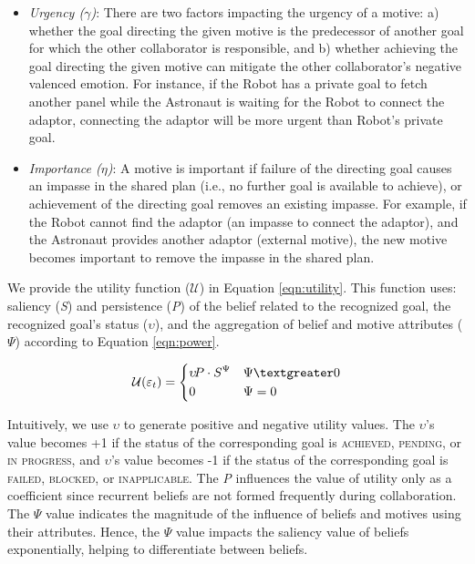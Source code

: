 \documentclass[12pt]{report}
\begin{document}
\begin{itemize}
  \setlength\itemsep{1mm}
  \item \textit{Urgency ($\gamma$)}: There are two factors impacting the urgency
  of a motive: a) whether the goal directing the given motive is the predecessor of
  another goal for which the other collaborator is responsible, and b) whether
  achieving the goal directing the given motive can mitigate the other
  collaborator's negative valenced emotion. For instance, if the Robot has a
  private goal to fetch another panel while the Astronaut is waiting for the
  Robot to connect the adaptor, connecting the adaptor will be more urgent than
  Robot's private goal.
  \item \textit{Importance ($\eta$)}: A motive is important if failure of the
  directing goal causes an impasse in the shared plan (i.e., no further goal is
  available to achieve), or achievement of the directing goal removes an
  existing impasse. For example, if the Robot cannot find the adaptor (an
  impasse to connect the adaptor), and the Astronaut provides another adaptor
  (external motive), the new motive becomes important to remove the impasse in
  the shared plan.
\end{itemize}

We provide the utility function ($\mathcal{U}$) in Equation \ref{eqn:utility}.
This function uses: saliency (\textit{S}) and persistence (\textit{P}) of the
belief related to the recognized goal, the recognized goal's status
($\upsilon$), and the aggregation of belief and motive attributes ($\Psi$)
according to Equation \ref{eqn:power}.

\begin{equation}
    \mathcal{U}(\varepsilon_t)= 
    \begin{dcases}
       \upsilon\!P\cdot S^{\Psi} & \Psi \textgreater 0 \\
       0               			 & \Psi = 0
    \end{dcases}
    \label{eqn:utility}
\end{equation}

Intuitively, we use $\upsilon$ to generate positive and negative utility values.
The $\upsilon$'s value becomes +1 if the status of the corresponding goal is
\textsc{achieved}, \textsc{pending}, or \textsc{in progress}, and $\upsilon$'s
value becomes -1 if the status of the corresponding goal is \textsc{failed,
blocked}, or \textsc{inapplicable}. The \textit{P} influences the value of
utility only as a coefficient since recurrent beliefs are not formed frequently
during collaboration. The $\Psi$ value indicates the magnitude of the influence
of beliefs and motives using their attributes. Hence, the $\Psi$ value impacts
the saliency value of beliefs exponentially, helping to differentiate between
beliefs.
\end{document}

